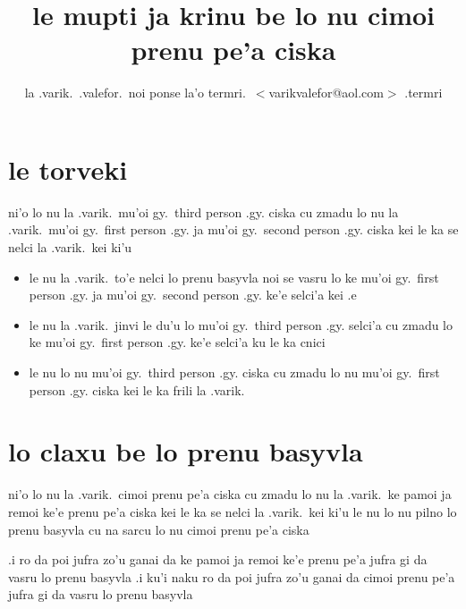 \documentclass{article}
\title{le mupti ja krinu be lo nu cimoi prenu pe'a ciska}
\author{la .varik.\ .valefor.\ noi ponse la'o termri.\ $<$varikvalefor@aol.com$>$ .termri}
\begin{document}
\maketitle

\section{le torveki}
ni'o lo nu la .varik.\ mu'oi gy.\ third person .gy. ciska cu zmadu lo nu la .varik.\ mu'oi gy.\ first person .gy. ja mu'oi gy.\ second person .gy. ciska kei le ka se nelci la .varik.\ kei ki'u
\begin{itemize}
	\item le nu la .varik.\ to'e nelci lo prenu basyvla noi se vasru lo ke mu'oi gy.\ first person .gy. ja mu'oi gy.\ second person .gy. ke'e selci'a kei .e
	\item le nu la .varik.\ jinvi le du'u lo mu'oi gy.\ third person .gy. selci'a cu zmadu lo ke mu'oi gy.\ first person .gy. ke'e selci'a ku le ka cnici
	\item le nu lo nu mu'oi gy.\ third person .gy. ciska cu zmadu lo nu mu'oi gy.\ first person .gy. ciska kei le ka frili la .varik.
\end{itemize}

\section{lo claxu be lo prenu basyvla}
ni'o lo nu la .varik.\ cimoi prenu pe'a ciska cu zmadu lo nu la .varik.\ ke pamoi ja remoi ke'e prenu pe'a ciska kei le ka se nelci la .varik.\ kei ki'u le nu lo nu pilno lo prenu basyvla cu na sarcu lo nu cimoi prenu pe'a ciska

.i ro da poi jufra zo'u ganai da ke pamoi ja remoi ke'e prenu pe'a jufra gi da vasru lo prenu basyvla  .i ku'i naku ro da poi jufra zo'u ganai da cimoi prenu pe'a jufra gi da vasru lo prenu basyvla
\end{document}
